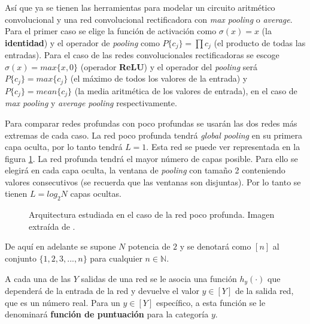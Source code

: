 Así que ya se tienen las herramientas para modelar un circuito aritmético convolucional y una red convolucional rectificadora con \textit{max pooling} o \textit{average}. Para el primer caso se elige la función de activación como $\sigma(x)=x$ (la \textbf{identidad}) y el operador de \textit{pooling} como $P\{c_j\}=\prod c_j$ (el producto de todas las entradas). Para el caso de las redes convolucionales rectificadoras se escoge $\sigma(x)=max\{x,0\}$ (operador \textbf{ReLU}) y el operador del \textit{pooling} será $P\{c_j\}=max\{c_j\}$ (el máximo de todos los valores de la entrada) y $P\{c_j\}=mean\{c_j\}$ (la media aritmética de los valores de entrada), en el caso de \textit{max pooling} y \textit{average pooling} respectivamente.

Para comparar redes profundas con poco profundas se usarán las dos redes más extremas de cada caso. La red poco profunda tendrá \textit{global pooling} en su primera capa oculta, por lo tanto tendrá $L=1$. Esta red se puede ver representada en la figura \ref{fig:red_convolucional_poco_prof}. La red profunda tendrá el mayor número de capas posible. Para ello se elegirá en cada capa oculta, la ventana de \textit{pooling} con tamaño 2 conteniendo valores consecutivos (se recuerda que las ventanas son disjuntas). Por lo tanto se tienen $L=log_2 N$ capas ocultas.

\begin{figure}[h]
\noindent
{}
\caption{Arquitectura estudiada en el caso de la red poco profunda. Imagen extraída de \cite{DBLP:journals/corr/CohenS16}.}
\label{fig:red_convolucional_poco_prof}
\end{figure}


De aquí en adelante se supone $N$ potencia de $2$ y se denotará como $[n]$ al conjunto $\{1,2,3,... ,n\}$ para cualquier $n\in\mathbb{N}$.

A cada una de las $Y$ salidas de una red se le asocia una función $h_y(\cdot)$ que dependerá de la entrada de la red y devuelve el valor $y\in[Y]$ de la salida red, que es un número real. Para un $y\in[Y]$ específico, a esta función se le denominará \textbf{función de puntuación} para la categoría $y$.

